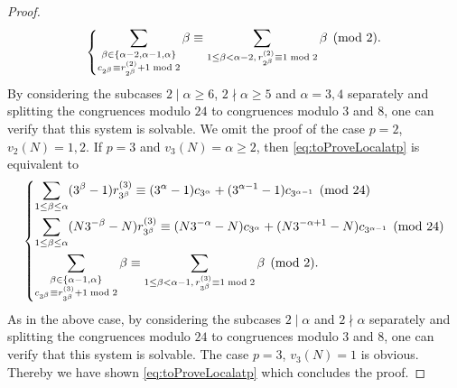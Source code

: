 \documentclass[12pt]{amsart}
\numberwithin{equation}{section}
\theoremstyle{plain}
\theoremstyle{definition}
\theoremstyle{remark}
\newcommand\twoscript[2]{\substack{{#1} \\ {#2}}}
\begin{document}
\begin{proof}
\begin{equation*}
\begin{dcases}
\sum_{\twoscript{\beta\in\{\alpha-2,\alpha-1,\alpha\}}{c_{2^\beta}\equiv r^{(2)}_{2^\beta}+1\bmod2}}\beta\equiv \sum_{1\leq\beta<\alpha-2,\,r^{(2)}_{2^\beta}\equiv1\bmod2}\beta \pmod 2.
\end{dcases}
\end{equation*}
By considering the subcases $2\mid \alpha\geq6$, $2\nmid \alpha\geq5$ and $\alpha=3,4$ separately and splitting the congruences modulo $24$ to congruences modulo $3$ and $8$, one can verify that this system is solvable. We omit the proof of the case $p=2$, $v_2(N)=1,2$. If $p=3$ and $v_3(N)=\alpha\geq2$, then 
\eqref{eq:toProveLocalatp} is equivalent to
\begin{equation*}
\begin{dcases}
\sum_{1\leq\beta\leq \alpha}(3^\beta-1)r^{(3)}_{3^\beta}\equiv (3^\alpha-1)c_{3^\alpha}+(3^{\alpha-1}-1)c_{3^{\alpha-1}} \pmod{24}\\
\sum_{1\leq\beta\leq \alpha}(N3^{-\beta}-N)r^{(3)}_{3^\beta}\equiv (N3^{-\alpha}-N)c_{3^\alpha}+(N3^{-\alpha+1}-N)c_{3^{\alpha-1}} \pmod{24}\\
\sum_{\twoscript{\beta\in\{\alpha-1,\alpha\}}{c_{3^\beta}\equiv r^{(3)}_{3^\beta}+1\bmod2}}\beta\equiv \sum_{1\leq\beta<\alpha-1,\,r^{(3)}_{3^\beta}\equiv1\bmod2}\beta \pmod 2.
\end{dcases}
\end{equation*}
As in the above case, by considering the subcases $2\mid \alpha$ and $2\nmid\alpha$ separately and splitting the congruences modulo $24$ to congruences modulo $3$ and $8$, one can verify that this system is solvable. The case $p=3$, $v_3(N)=1$ is obvious. Thereby we have shown \eqref{eq:toProveLocalatp} which concludes the proof.
\end{proof}
\end{document}
